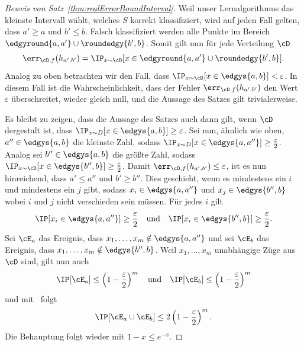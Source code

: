 \documentclass[language=ngerman,algolist,acrolist]{TemplateLecture}
\begin{document}
\begin{proof}[Beweis von Satz~\ref{thm:realErrorBoundInterval}]
    Weil unser Lernalgorithmus das kleinste Intervall wählt, welches $S$ korrekt klassifiziert, wird auf jeden Fall gelten, dass $a' \geq a$ und $b' \leq b$. Falsch klassifiziert werden alle Punkte im Bereich $\edgyround{a, a'} \cup \roundedgy{b', b}$. Somit gilt nun für jede Verteilung $\cD$
    \begin{equation*}
        \err_{\cD, f}(h_{a', b'}) = \IP_{x \sim \cD}[x \in \edgyround{a, a'} \cup \roundedgy{b', b}].
    \end{equation*}
    Analog zu oben betrachten wir den Fall, dass $\IP_{x \sim \cD}[x \in \edgys{a,b}] < \varepsilon$. In diesem Fall ist die Wahrscheinlichkeit, dass der Fehler $\err_{\cD,f} (h_{a', b'})$ den Wert $\varepsilon$ überschreitet, wieder gleich null, und die Aussage des Satzes gilt trivialerweise.

    Es bleibt zu zeigen, dass die Aussage des Satzes auch dann gilt, wenn $\cD$ dergestalt ist, dass $\IP_{x\sim D} [x \in \edgys{a,b}] \geq \varepsilon$. Sei nun, ähnlich wie oben, $a'' \in \edgys{a,b}$ die kleinste Zahl, sodass $\IP_{x \sim D} [x \in \edgys{a, a''}] \geq \frac{\varepsilon}{2}$. Analog sei $b'' \in \edgys{a,b}$ die größte Zahl, sodass $\IP_{x \sim \cD} [x \in \edgys{b'', b}] \geq \frac{\varepsilon}{2}$. Damit $\err_{\cD,f} (h_{a', b'}) \leq \varepsilon$, ist es nun hinreichend, dass $a' \leq a''$ und $b' \geq b''$. Dies geschieht, wenn es mindestens ein $i$ und mindestens ein $j$ gibt, sodass $x_i \in \edgys{a, a''}$ und $x_j \in \edgys{b'', b}$ wobei $i$ und $j$ nicht verschieden sein müssen. Für jedes $i$ gilt
    \begin{equation*}
        \IP[x_i \in \edgys{a, a''}] \geq \frac{\varepsilon}{2} \quad \text{und} \quad \IP[x_i \in \edgys{b'', b}] \geq \frac{\varepsilon}{2}.
    \end{equation*}
    Sei $\cE_a$ das Ereignis, dass $x_1, \ldots, x_m \notin \edgys{a, a''}$ und sei $\cE_b$ das Ereignis, dass $x_1, \ldots, x_m \notin \edgys{b'', b}$. Weil $x_1, \ldots, x_m$ unabhängige Züge aus $\cD$ sind, gilt nun auch 
    \begin{equation*}
        \IP[\cE_a] \leq \left( 1 - \frac{\varepsilon}{2} \right)^m \quad \text{und} \quad \IP[\cE_b] \leq \left( 1 - \frac{\varepsilon}{2} \right)^m
    \end{equation*}
    und mit~ folgt 
    \begin{equation*}
        \IP[\cE_a \cup \cE_b] \leq 2\left( 1 - \frac{\varepsilon}{2} \right)^m.
    \end{equation*}
    Die Behauptung folgt wieder mit $1 - x \leq e^{-x}$.
\end{proof}
\end{document}
